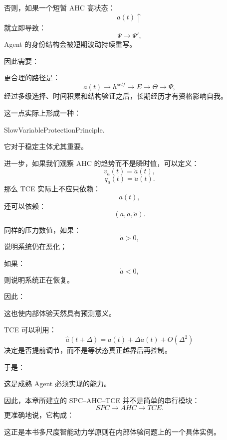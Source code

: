 否则，如果一个短暂 AHC 高状态：
\[
a(t)\uparrow
\]
就立即导致：
\[
\Psi\rightarrow\Psi',
\]
Agent 的身份结构会被短期波动持续重写。

因此需要：
\begin{statementbox}
\centering
{}
\end{statementbox}
更合理的路径是：
\[
a(t)
\rightarrow
h^{self}
\rightarrow
E
\rightarrow
\Theta
\rightarrow
\Psi,
\]
经过多级选择、时间积累和结构验证之后，长期经历才有资格影响自我。

这一点实际上形成一种：
\begin{statementbox}
SlowVariableProtectionPrinciple.
\end{statementbox}

它对于稳定主体尤其重要。

进一步，如果我们观察 AHC 的趋势而不是瞬时值，可以定义：
\[
v_a(t)=\dot a(t),
\]
\[
q_a(t)=\ddot a(t).
\]
那么 TCE 实际上不应只依赖：
\[
a(t),
\]
还可以依赖：
\[
(a,\dot a,\ddot a).
\]

同样的压力数值，如果：
\[
\dot a>0,
\]
说明系统仍在恶化；

如果：
\[
\dot a<0,
\]
则说明系统正在恢复。

因此：
\begin{statementbox}
\centering
{}
\end{statementbox}

这也使内部体验天然具有预测意义。

TCE 可以利用：
\[
\hat a(t+\Delta)
=
a(t)
+
\Delta\dot a(t)
+
O(\Delta^2)
\]
决定是否提前调节，而不是等状态真正越界后再控制。

于是：
\begin{statementbox}
\centering
{}
\end{statementbox}

这是成熟 Agent 必须实现的能力。

因此，本章所建立的 SPC--AHC--TCE 并不是简单的串行模块：
\[
SPC\rightarrow AHC\rightarrow TCE.
\]
更准确地说，它构成：
\begin{statementbox}
\centering
{}
\end{statementbox}
这正是本书多尺度智能动力学原则在内部体验问题上的一个具体实例。

